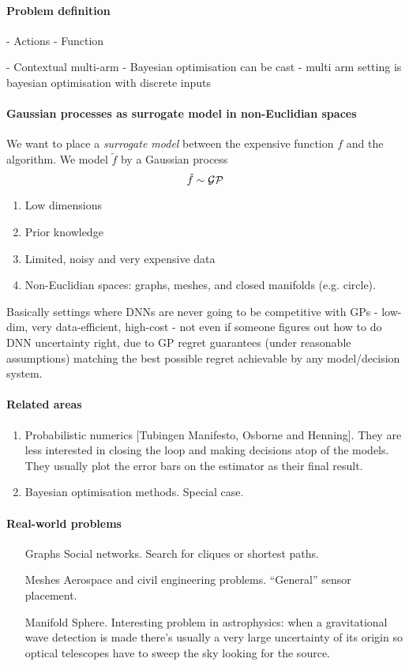 \paragraph{Problem definition}
- Actions
- Function

- Contextual multi-arm
- Bayesian optimisation can be cast 
- multi arm setting is bayesian optimisation with discrete inputs


\paragraph{Gaussian processes as surrogate model in non-Euclidian spaces}
We want to place a \emph{surrogate model} between the expensive function $f$ and the algorithm. We model $\tilde{f}$ by a Gaussian process
\begin{equation}
    \tilde{f} \sim \mathcal{GP}
\end{equation}

\begin{enumerate}
    \item Low dimensions
    \item Prior knowledge
    \item Limited, noisy and very expensive data
    \item Non-Euclidian spaces: graphs, meshes, and closed manifolds (e.g. circle).
\end{enumerate}

Basically settings where DNNs are never going to be competitive with GPs - low-dim, very data-efficient, high-cost - not even if someone figures out how to do DNN uncertainty right, due to GP regret guarantees (under reasonable assumptions) matching the best possible regret achievable by any model/decision system.

\paragraph{Related areas}
\begin{enumerate}
    \item Probabilistic numerics [Tubingen Manifesto, Osborne and Henning]. They are less interested in closing the loop and making decisions atop of the models. They usually plot the error bars on the estimator as their final result.
    \item Bayesian optimisation methods. Special case.
\end{enumerate}

\paragraph{Real-world problems}
\begin{itemize}
    \item[Graphs] Social networks. Search for cliques or shortest paths.
    \item[Meshes] Aerospace and civil engineering problems. ``General'' sensor placement.
    \item[Manifold] Sphere. Interesting problem in astrophysics: when a gravitational wave detection is made there's usually a very large uncertainty of its origin so optical telescopes have to sweep the sky looking for the source.
\end{itemize}

